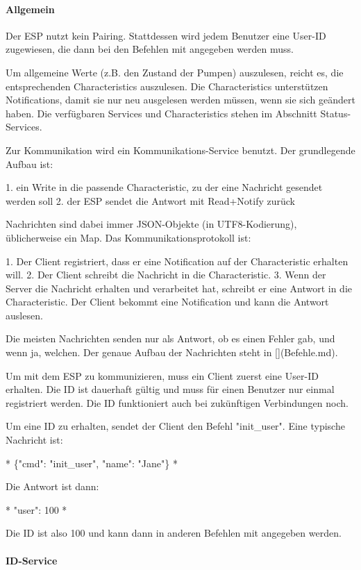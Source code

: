 \paragraph{ Allgemein}

Der ESP nutzt kein Pairing. Stattdessen wird jedem Benutzer eine User-ID zugewiesen, die dann bei den Befehlen mit angegeben werden muss.

Um allgemeine Werte (z.B. den Zustand der Pumpen) auszulesen, reicht es, die entsprechenden Characteristics auszulesen. Die Characteristics unterstützen Notifications, damit sie nur neu ausgelesen werden müssen, wenn sie sich geändert haben. Die verfügbaren Services und Characteristics stehen im Abschnitt Status-Services.

Zur Kommunikation wird ein Kommunikations-Service benutzt. Der grundlegende Aufbau ist:

1. ein Write in die passende Characteristic, zu der eine Nachricht gesendet werden soll
2. der ESP sendet die Antwort mit Read+Notify zurück

Nachrichten sind dabei immer JSON-Objekte (in UTF8-Kodierung), üblicherweise ein Map. Das Kommunikationsprotokoll ist:

1. Der Client registriert, dass er eine Notification auf der Characteristic erhalten will.
2. Der Client schreibt die Nachricht in die Characteristic.
3. Wenn der Server die Nachricht erhalten und verarbeitet hat, schreibt er eine Antwort in die Characteristic. Der Client bekommt eine Notification und kann die Antwort auslesen.

Die meisten Nachrichten senden nur als Antwort, ob es einen Fehler gab, und wenn ja, welchen. Der genaue Aufbau der Nachrichten steht in [](Befehle.md).

Um mit dem ESP zu kommunizieren, muss ein Client zuerst eine User-ID erhalten. Die ID ist dauerhaft gültig und muss für einen Benutzer nur einmal registriert werden. Die ID funktioniert auch bei zukünftigen Verbindungen noch.

Um eine ID zu erhalten, sendet der Client den Befehl "init\_user". Eine typische Nachricht ist:

*
\{"cmd": "init\_user", "name": "Jane"\}
*

Die Antwort ist dann:

*
{"user": 100}
*

Die ID ist also 100 und kann dann in anderen Befehlen mit angegeben werden.

\paragraph{ ID-Service}


